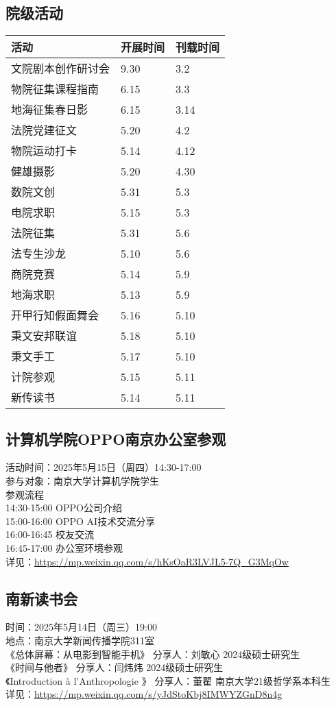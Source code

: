 \documentclass[letterpaper, 12pt]{article}
\begin{document}
\begin{multicols}{2}
\section{院级活动}
\begin{tabular}{|>{\centering\arraybackslash}m{}|m{}|m{}|}
\hline
    活动 & 开展时间 & 刊载时间\\
    \hline\hline
    文院剧本创作研讨会 & 9.30 & 3.2\\
    物院征集课程指南 & 6.15 & 3.3\\
    地海征集春日影 & 6.15 & 3.14\\
    法院党建征文 & 5.20 & 4.2\\
    物院运动打卡 & 5.14 & 4.12\\
    健雄摄影 & 5.20 & 4.30\\
    数院文创 & 5.31 & 5.3\\
    电院求职 & 5.15 & 5.3\\
    法院征集 & 5.31 & 5.6\\
    法专生沙龙 & 5.10 & 5.6\\
    商院竞赛 & 5.14 & 5.9\\
    地海求职 & 5.13 & 5.9\\
    开甲行知假面舞会 & 5.16 & 5.10\\
    秉文安邦联谊 & 5.18 & 5.10\\
    秉文手工 & 5.17 & 5.10\\
    计院参观 & 5.15 & 5.11\\
    新传读书 & 5.14 & 5.11\\
    \hline
\end{tabular}
\subsection{计算机学院OPPO南京办公室参观} %
活动时间：2025年5月15日（周四）14:30-17:00
\\参与对象：南京大学计算机学院学生 
\\参观流程
\\14:30-15:00 OPPO公司介绍
\\15:00-16:00 OPPO AI技术交流分享
\\16:00-16:45 校友交流
\\16:45-17:00 办公室环境参观
\\详见：\url{https://mp.weixin.qq.com/s/hKsOaR3LVJL5-7Q_G3MqOw}

\subsection{南新读书会} %
时间：2025年5月14日（周三）19:00
\\地点：南京大学新闻传播学院311室
\\《总体屏幕：从电影到智能手机》 分享人：刘敏心 2024级硕士研究生
\\《时间与他者》 分享人：闫炜炜 2024级硕士研究生
\\《Introduction à l'Anthropologie 》 分享人：董翟 南京大学21级哲学系本科生
\\详见：\url{https://mp.weixin.qq.com/s/yJdStoKbj8IMWYZGnD8n4g}


\end{multicols}
\end{document}
